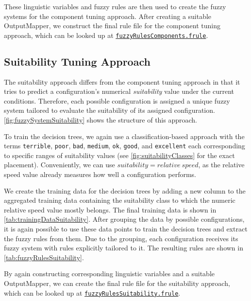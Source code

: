 \noindent These linguistic variables and fuzzy rules are then used to create the fuzzy systems for the component tuning approach. After creating a suitable OutputMapper, we construct the final rule file for the component tuning approach, which can be looked up at \href{https://github.com/AutoPas/AutoPas/blob/f77f10f72c19a86d5471bce287ae3a4ae344c012/examples/md-flexible/input/fuzzyRulesComponents.frule}{\color{blue}\texttt{fuzzyRulesComponents.frule}}.

\newpage

\subsection{Suitability Tuning Approach}

The suitability approach differs from the component tuning approach in that it tries to predict a configuration's numerical \emph{suitability} value under the current conditions. Therefore, each possible configuration is assigned a unique fuzzy system tailored to evaluate the suitability of its assigned configuration. \autoref{fig:fuzzySystemSuitability} shows the structure of this approach.

\smallskip

To train the decision trees, we again use a classification-based approach with the terms \texttt{terrible}, \texttt{poor}, \texttt{bad}, \texttt{medium}, \texttt{ok}, \texttt{good}, and \texttt{excellent} each corresponding to specific ranges of suitability values (see \autoref{fig:suitabilityClasses} for the exact placement). Conveniently, we can use $suitability = relative \ speed$, as the relative speed value already measures how well a configuration performs.

\smallskip

We create the training data for the decision trees by adding a new column to the aggregated training data containing the suitability class to which the numeric relative speed value mostly belongs. The final training data is shown in \autoref{tab:trainingDataSuitability}. After grouping the data by possible configurations, it is again possible to use these data points to train the decision trees and extract the fuzzy rules from them. Due to the grouping, each configuration receives its fuzzy system with rules explicitly tailored to it. The resulting rules are shown in \autoref{tab:fuzzyRulesSuitability}.

\medskip

\noindent By again constructing corresponding linguistic variables and a suitable OutputMapper, we can create the final rule file for the suitability approach, which can be looked up at \href{https://github.com/AutoPas/AutoPas/blob/f77f10f72c19a86d5471bce287ae3a4ae344c012/examples/md-flexible/input/fuzzyRulesSuitability.frule}{\color{blue}\texttt{fuzzyRulesSuitability.frule}}.

